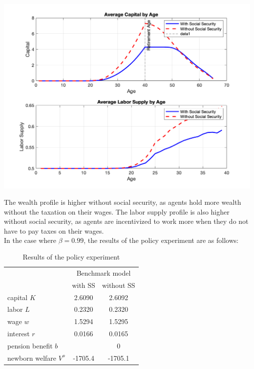 \documentclass[10pt,a4paper]{article}
\begin{document}
\includegraphics[width=\textwidth]{wealth_labor_profiles.png}

The wealth profile is higher without social security, as agents
hold more wealth without the taxation on their wages.
The labor supply profile is also higher without social security, as agents are incentivized to work more when they do not have to pay taxes on their wages.
\\

In the case where $\beta = 0.99$, the results of the policy experiment are as follows:


\begin{table}[h]
\centering
\begin{tabular}{|l|c|c|}
\hline
 & \multicolumn{2}{c|}{Benchmark model} \\
\cline{2-3}
 & with SS & without SS \\
\hline
capital $K$ & 2.6090 & 2.6092 \\
\hline
labor $L$ & 0.2320 & 0.2320 \\
\hline
wage $w$ & 1.5294 & 1.5295 \\
\hline
interest $r$ & 0.0166 & 0.0165 \\
\hline
pension benefit $b$ & \approx 0 & 0 \\
\hline
newborn welfare $V^o$ & -1705.4 & -1705.1 \\
\hline
\end{tabular}
\caption{Results of the policy experiment}
\end{table}
\end{document}

